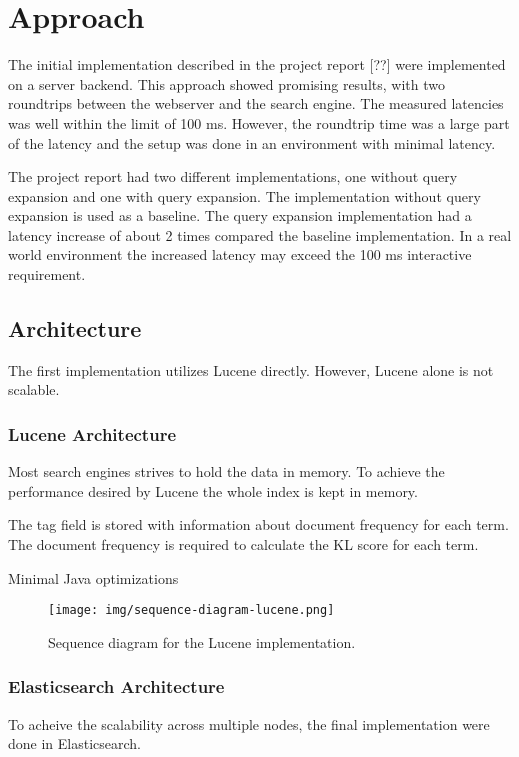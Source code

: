 \chapter{Approach}
\label{ch:approach}
The initial implementation described in the project report [??] were implemented on a server backend.
This approach showed promising results, with two roundtrips between the webserver and the search engine.
The measured latencies was well within the limit of 100 ms.
However, the roundtrip time was a large part of the latency and the setup was done in an environment with minimal latency.

The project report had two different implementations, one without query expansion and one with query expansion.
The implementation without query expansion is used as a baseline.
The query expansion implementation had a latency increase of about 2 times compared the baseline implementation.
In a real world environment the increased latency may exceed the 100 ms interactive requirement.

\section{Architecture}
The first implementation utilizes Lucene directly.
However, Lucene alone is not scalable.

\subsection{Lucene Architecture}
Most search engines strives to hold the data in memory.
To achieve the performance desired by Lucene the whole index is kept in memory.

The tag field is stored with information about document frequency for each term.
The document frequency is required to calculate the KL score for each term.

Minimal Java optimizations

\begin{figure}[h!]
\centering \texttt{[image: img/sequence-diagram-lucene.png]}
\caption{Sequence diagram for the Lucene implementation.}
\label{fig:sequence-diagram-lucene}
\end{figure}

\subsection{Elasticsearch Architecture}
To acheive the scalability across multiple nodes, the final implementation were done in Elasticsearch.


